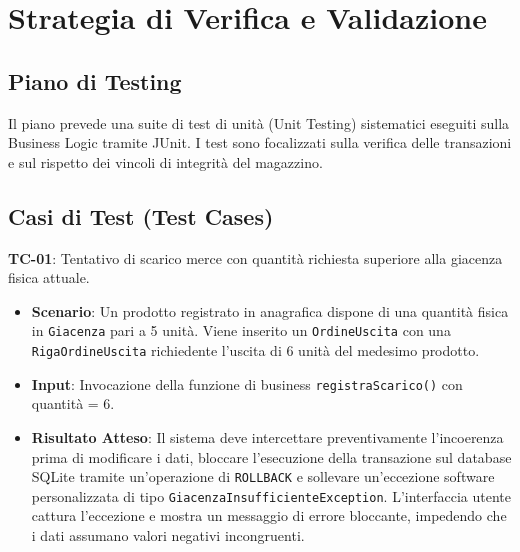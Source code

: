\documentclass[a4paper,12pt]{article}
\begin{document}
\section{Strategia di Verifica e Validazione}
\subsection{Piano di Testing}
Il piano prevede una suite di test di unità (Unit Testing) sistematici eseguiti sulla Business Logic tramite JUnit. I test sono focalizzati sulla verifica delle transazioni e sul rispetto dei vincoli di integrità del magazzino.

\subsection{Casi di Test (Test Cases)}
\textbf{TC-01}: Tentativo di scarico merce con quantità richiesta superiore alla giacenza fisica attuale.
\begin{itemize}
	\item \textbf{Scenario}: Un prodotto registrato in anagrafica dispone di una quantità fisica in \texttt{Giacenza} pari a 5 unità. Viene inserito un \texttt{OrdineUscita} con una \texttt{RigaOrdineUscita} richiedente l'uscita di 6 unità del medesimo prodotto.
	\item \textbf{Input}: Invocazione della funzione di business \texttt{registraScarico()} con quantità = 6.
	\item \textbf{Risultato Atteso}: Il sistema deve intercettare preventivamente l'incoerenza prima di modificare i dati, bloccare l'esecuzione della transazione sul database SQLite tramite un'operazione di \texttt{ROLLBACK} e sollevare un'eccezione software personalizzata di tipo \texttt{GiacenzaInsufficienteException}. L'interfaccia utente cattura l'eccezione e mostra un messaggio di errore bloccante, impedendo che i dati assumano valori negativi incongruenti.
\end{itemize}
\end{document}

